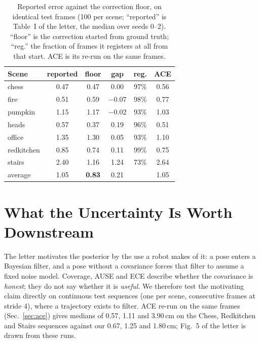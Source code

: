 \documentclass[journal]{IEEEtran}
\begin{document}
\begin{table}[t]
\caption{Reported error against the correction floor, on identical test
frames (100 per scene; ``reported'' is Table~I of the letter, the median over seeds 0--2). ``floor'' is the correction started from ground truth; ``reg.'' the fraction of frames it registers at all from that start.
ACE is its re-run on the same frames.}
\label{tab:headroom}
\centering\footnotesize
\setlength{\tabcolsep}{4pt}
\begin{tabular}{@{}lccccc@{}}
\toprule
Scene & reported & floor & gap & reg. & ACE \\
\midrule
chess      & 0.47 & 0.47 & 0.00 & 97\% & 0.56 \\
fire       & 0.51 & 0.59 & $-$0.07 & 98\% & 0.77 \\
pumpkin    & 1.15 & 1.17 & $-$0.02 & 93\% & 1.03 \\
heads      & 0.57 & 0.37 & 0.19 & 96\% & 0.51 \\
office     & 1.35 & 1.30 & 0.05 & 93\% & 1.10 \\
redkitchen & 0.85 & 0.74 & 0.11 & 99\% & 0.75 \\
stairs     & 2.40 & 1.16 & 1.24 & 73\% & 2.64 \\
\midrule
average    & 1.05 & \textbf{0.83} & 0.21 & & 1.05 \\
\bottomrule
\end{tabular}
\end{table}

\section{What the Uncertainty Is Worth Downstream}
\label{sec:benefit}
The letter motivates the posterior by the use a robot makes of it: a pose
enters a Bayesian filter, and a pose without a covariance forces that filter
to assume a fixed noise model. Coverage, AUSE and ECE describe whether the
covariance is \emph{honest}; they do not say whether it is \emph{useful}. We
therefore test the motivating claim directly on continuous test sequences
(one per scene, consecutive frames at stride 4), where a trajectory exists to
filter. ACE re-run on the same frames (Sec.~\ref{sec:ace}) gives medians of 0.57, 1.11 and 3.90\,cm on the Chess, Redkitchen and Stairs sequences against our 0.67, 1.25 and 1.80\,cm; Fig.~5 of the letter is drawn from these runs.
\end{document}
